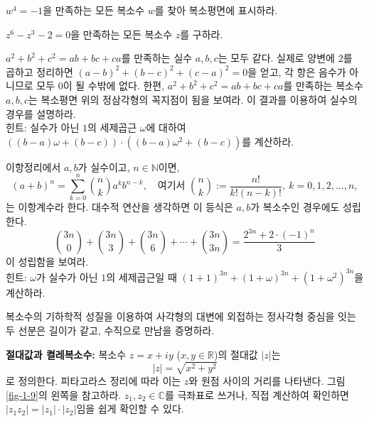 \begin{salt_exercise} \label{ex-1-9}
$w^4=-1$을 만족하는 모든 복소수 $w$를 찾아
복소평면에 표시하라.
\end{salt_exercise}

\begin{salt_exercise} \label{ex-1-10}
$z^6-z^3-2=0$을 만족하는 모든 복소수 $z$를 구하라.
\end{salt_exercise}

\begin{salt_exercise} \label{ex-1-11}
$a^2+b^2+c^2= ab+bc+ca$를 만족하는 실수 $a,b,c$는 모두 같다.
실제로 양변에 $2$를 곱하고 정리하면
$(a-b)^2+(b-c)^2+(c-a)^2=0$을 얻고, 
각 항은 음수가 아니므로 모두 $0$이 될 수밖에 없다.
한편, $a^2+b^2+c^2= ab+bc+ca$를 만족하는 복소수 $a,b,c$는
복소평면 위의 정삼각형의 꼭지점이 됨을 보여라.
이 결과를 이용하여 실수의 경우를 설명하라. \\[1ex]
힌트: 실수가 아닌 $1$의 세제곱근 $\omega$에 대하여
$((b-a)\omega + (b-c))\cdot((b-a)\omega^2 + (b-c))$를 계산하라.
\end{salt_exercise}

\begin{salt_exercise} \label{ex-1-12}
이항정리에서
$a,b$가 실수이고, $n\in\mathbb N$이면,
$$
(a+b)^n = \sum_{k=0}^n {n \choose k}a^kb^{n-k},
\quad
\text{여기서 }
{n \choose k} := \frac{n!}{k!(n-k)!}, \
k=0,1,2,\ldots, n,
$$
는 이항계수라 한다.
대수적 연산을 생각하면 이 등식은 $a,b$가 복소수인 경우에도 성립한다.
$$
{3n \choose 0} + {3n \choose 3} + {3n \choose 6} + \cdots
+ {3n \choose 3n} = \dfrac{2^{3n} + 2\cdot(-1)^n}3
$$
이 성립함을 보여라. \\[1ex]
힌트: $\omega$가 실수가 아닌 $1$의 세제곱근일 때
$(1+1)^{3n} + (1+\omega)^{3n} + (1+\omega^2)^{3n}$을 계산하라.
\end{salt_exercise}

\begin{salt_exercise} \label{ex-1-13}
복소수의 기하학적 성질을 이용하여 
사각형의 대변에 외접하는 정사각형 중심을 잇는 두 선분은
길이가 같고, 수직으로 만남을 증명하라.
\end{salt_exercise}

{\bf 절대값과 켤레복소수: }
복소수 $z=x+iy$ ($x,y\in\mathbb R$)의 절대값 $|z|$는
$$
|z| = \sqrt{x^2+y^2}
$$
로 정의한다.
피타고라스 정리에 따라 이는 $z$와 원점 사이의 거리를 나타낸다.
그림 \ref{fig-1-9}의 왼쪽을 참고하라.
$z_1, z_2\in \mathbb C$를 극좌표로 쓰거나, 직접 계산하여 확인하면
$|z_1z_2| = |z_1|\cdot |z_2|$임을 쉽게 확인할 수 있다.


